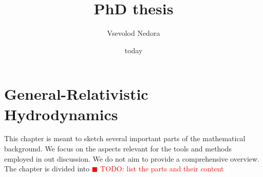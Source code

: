 \documentclass[11pt,a4paper,headinclude=true,DIV=14,BCOR=8mm,chapterprefix,listof=totoc,twoside,openright,abstracton]{scrbook}
\title{PhD thesis}
\author{Vsevolod Nedora}
\date{today}
\newcommand{\todo}[1]{\textcolor{red}{$\blacksquare$ TODO: #1}}
\begin{document}
    
    \maketitle


\chapter{General-Relativistic Hydrodynamics}

This chapter is meant to sketch several important parts of the mathematical background. We focus on the aspects relevant for the tools and methods employed in out discussion. We do not aim to provide a comprehensive overview. 
The chapter is divided into \todo{list the parts and their content}
\end{document}
